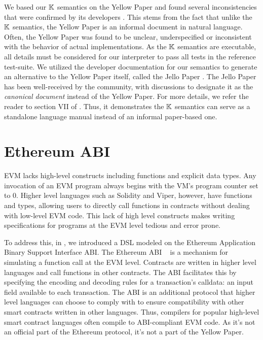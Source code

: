 We based our $\mathbb{K}$ semantics on the Yellow Paper and
found several inconsistencies that were confirmed by its developers \cite{HildenbrandtCSF18}.
This stems from the fact that unlike the $\mathbb{K}$ semantics,
the Yellow Paper is an informal document in natural language.
Often, the Yellow Paper was found to be unclear, underspecified
or inconsistent with the behavior of actual implementations.
As the $\mathbb{K}$ semantics are executable, all details must be
considered for our interpreter to pass all tests in the reference
test-suite. We utilized the developer documentation for our semantics
to generate an alternative to the Yellow Paper itself, called the Jello Paper
\cite{EvmJellopaperUrl}. The Jello Paper has been well-received by the
community, with discussions to designate it as the \emph{canonical document}
instead of the Yellow Paper. For more details, we refer the reader to
section VII of \cite{HildenbrandtCSF18}. Thus, it demonstrates the $\mathbb{K}$ semantics
can serve as a standalone language manual instead of an informal paper-based
one.

\section{Ethereum ABI \DSL{}}\label{sec:ethereum-abi-dsl}

EVM lacks high-level constructs including functions and explicit data types.
Any invocation of an EVM program always begins with the VM’s program counter set to 0.
Higher level languages such as Solidity and Viper, however, have functions and types, allowing users to directly call functions in contracts without dealing with low-level EVM code.
This lack of high level constructs makes writing specifications for programs
at the EVM level tedious and error prone.

To address this, in \cite{HildenbrandtCSF18}, we introduced a DSL modeled on the
Ethereum Application Binary Support Interface ABI.
The Ethereum ABI ~\cite{EthereumAbiUrl} is a mechanism for simulating a function call at the EVM level.
Contracts are written in higher level languages and call functions in other contracts.
The ABI facilitates this by specifying the encoding and decoding rules for a transaction's
calldata: an input field available to each transaction. The ABI
is an additional protocol that higher level
languages can choose to comply with to ensure compatibility with other smart
contracts written in other languages. Thus, compilers for popular high-level
smart contract languages often compile to ABI-compliant EVM code. As it's not
an official part of the Ethereum protocol, it's not a part of the Yellow Paper.

